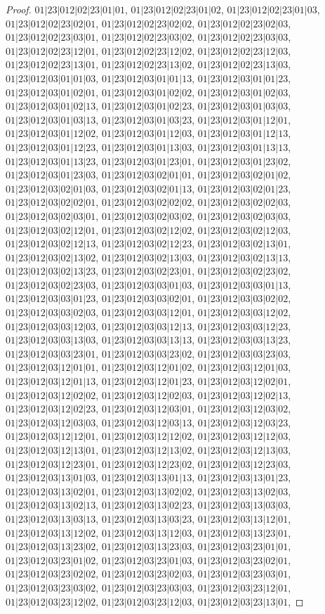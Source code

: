 \documentclass[12pt]{article}
\theoremstyle{plain}
\theoremstyle{definition}
\theoremstyle{remark}
\begin{document}
\begin{proof}
$01|23|012|02|23|01|01$, $01|23|012|02|23|01|02$, $01|23|012|02|23|01|03$, $01|23|012|02|23|02|01$, $01|23|012|02|23|02|02$, $01|23|012|02|23|02|03$, $01|23|012|02|23|03|01$, $01|23|012|02|23|03|02$, $01|23|012|02|23|03|03$, $01|23|012|02|23|12|01$, $01|23|012|02|23|12|02$, $01|23|012|02|23|12|03$, $01|23|012|02|23|13|01$, $01|23|012|02|23|13|02$, $01|23|012|02|23|13|03$, $01|23|012|03|01|01|03$, $01|23|012|03|01|01|13$, $01|23|012|03|01|01|23$, $01|23|012|03|01|02|01$, $01|23|012|03|01|02|02$, $01|23|012|03|01|02|03$, $01|23|012|03|01|02|13$, $01|23|012|03|01|02|23$, $01|23|012|03|01|03|03$, $01|23|012|03|01|03|13$, $01|23|012|03|01|03|23$, $01|23|012|03|01|12|01$, $01|23|012|03|01|12|02$, $01|23|012|03|01|12|03$, $01|23|012|03|01|12|13$, $01|23|012|03|01|12|23$, $01|23|012|03|01|13|03$, $01|23|012|03|01|13|13$, $01|23|012|03|01|13|23$, $01|23|012|03|01|23|01$, $01|23|012|03|01|23|02$, $01|23|012|03|01|23|03$, $01|23|012|03|02|01|01$, $01|23|012|03|02|01|02$, $01|23|012|03|02|01|03$, $01|23|012|03|02|01|13$, $01|23|012|03|02|01|23$, $01|23|012|03|02|02|01$, $01|23|012|03|02|02|02$, $01|23|012|03|02|02|03$, $01|23|012|03|02|03|01$, $01|23|012|03|02|03|02$, $01|23|012|03|02|03|03$, $01|23|012|03|02|12|01$, $01|23|012|03|02|12|02$, $01|23|012|03|02|12|03$, $01|23|012|03|02|12|13$, $01|23|012|03|02|12|23$, $01|23|012|03|02|13|01$, $01|23|012|03|02|13|02$, $01|23|012|03|02|13|03$, $01|23|012|03|02|13|13$, $01|23|012|03|02|13|23$, $01|23|012|03|02|23|01$, $01|23|012|03|02|23|02$, $01|23|012|03|02|23|03$, $01|23|012|03|03|01|03$, $01|23|012|03|03|01|13$, $01|23|012|03|03|01|23$, $01|23|012|03|03|02|01$, $01|23|012|03|03|02|02$, $01|23|012|03|03|02|03$, $01|23|012|03|03|12|01$, $01|23|012|03|03|12|02$, $01|23|012|03|03|12|03$, $01|23|012|03|03|12|13$, $01|23|012|03|03|12|23$, $01|23|012|03|03|13|03$, $01|23|012|03|03|13|13$, $01|23|012|03|03|13|23$, $01|23|012|03|03|23|01$, $01|23|012|03|03|23|02$, $01|23|012|03|03|23|03$, $01|23|012|03|12|01|01$, $01|23|012|03|12|01|02$, $01|23|012|03|12|01|03$, $01|23|012|03|12|01|13$, $01|23|012|03|12|01|23$, $01|23|012|03|12|02|01$, $01|23|012|03|12|02|02$, $01|23|012|03|12|02|03$, $01|23|012|03|12|02|13$, $01|23|012|03|12|02|23$, $01|23|012|03|12|03|01$, $01|23|012|03|12|03|02$, $01|23|012|03|12|03|03$, $01|23|012|03|12|03|13$, $01|23|012|03|12|03|23$, $01|23|012|03|12|12|01$, $01|23|012|03|12|12|02$, $01|23|012|03|12|12|03$, $01|23|012|03|12|13|01$, $01|23|012|03|12|13|02$, $01|23|012|03|12|13|03$, $01|23|012|03|12|23|01$, $01|23|012|03|12|23|02$, $01|23|012|03|12|23|03$, $01|23|012|03|13|01|03$, $01|23|012|03|13|01|13$, $01|23|012|03|13|01|23$, $01|23|012|03|13|02|01$, $01|23|012|03|13|02|02$, $01|23|012|03|13|02|03$, $01|23|012|03|13|02|13$, $01|23|012|03|13|02|23$, $01|23|012|03|13|03|03$, $01|23|012|03|13|03|13$, $01|23|012|03|13|03|23$, $01|23|012|03|13|12|01$, $01|23|012|03|13|12|02$, $01|23|012|03|13|12|03$, $01|23|012|03|13|23|01$, $01|23|012|03|13|23|02$, $01|23|012|03|13|23|03$, $01|23|012|03|23|01|01$, $01|23|012|03|23|01|02$, $01|23|012|03|23|01|03$, $01|23|012|03|23|02|01$, $01|23|012|03|23|02|02$, $01|23|012|03|23|02|03$, $01|23|012|03|23|03|01$, $01|23|012|03|23|03|02$, $01|23|012|03|23|03|03$, $01|23|012|03|23|12|01$, $01|23|012|03|23|12|02$, $01|23|012|03|23|12|03$, $01|23|012|03|23|13|01$, 
\end{proof}
\end{document}

